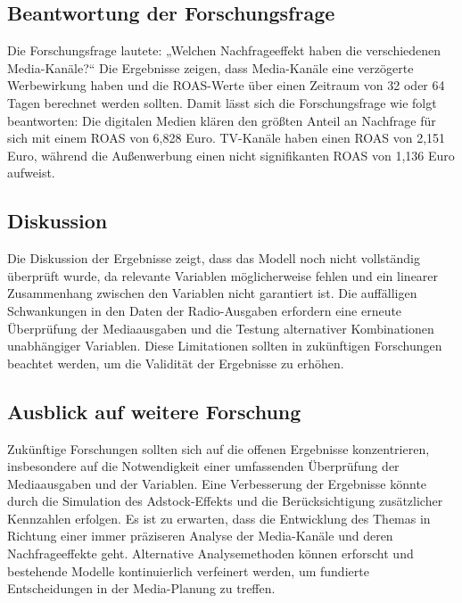 \subsection{Beantwortung der Forschungsfrage}
\label{Beantwortung}
Die Forschungsfrage lautete: „Welchen Nachfrageeffekt haben die verschiedenen Media-Kanäle?“ Die Ergebnisse zeigen, dass Media-Kanäle eine verzögerte Werbewirkung haben und die \ac{ROAS}-Werte über einen Zeitraum von 32 oder 64 Tagen berechnet werden sollten. Damit lässt sich die Forschungsfrage wie folgt beantworten: Die digitalen Medien klären den größten Anteil an Nachfrage für sich mit einem \ac{ROAS} von 6,828 Euro. TV-Kanäle haben einen \ac{ROAS} von 2,151 Euro, während die Außenwerbung einen nicht signifikanten \ac{ROAS} von 1,136 Euro aufweist.
\subsection{Diskussion}
\label{Diskussion}
Die Diskussion der Ergebnisse zeigt, dass das Modell noch nicht vollständig überprüft wurde, da relevante Variablen möglicherweise fehlen und ein linearer Zusammenhang zwischen den Variablen nicht garantiert ist. Die auffälligen Schwankungen in den Daten der Radio-Ausgaben erfordern eine erneute Überprüfung der Mediaausgaben und die Testung alternativer Kombinationen unabhängiger Variablen. Diese Limitationen sollten in zukünftigen Forschungen beachtet werden, um die Validität der Ergebnisse zu erhöhen.
\subsection{Ausblick auf weitere Forschung}
\label{Ausblick}
Zukünftige Forschungen sollten sich auf die offenen Ergebnisse konzentrieren, insbesondere auf die Notwendigkeit einer umfassenden Überprüfung der Mediaausgaben und der Variablen. Eine Verbesserung der Ergebnisse könnte durch die Simulation des Adstock-Effekts und die Berücksichtigung zusätzlicher Kennzahlen erfolgen. Es ist zu erwarten, dass die Entwicklung des Themas in Richtung einer immer präziseren Analyse der Media-Kanäle und deren Nachfrageeffekte geht. Alternative Analysemethoden können erforscht und bestehende Modelle kontinuierlich verfeinert werden, um fundierte Entscheidungen in der Media-Planung zu treffen.